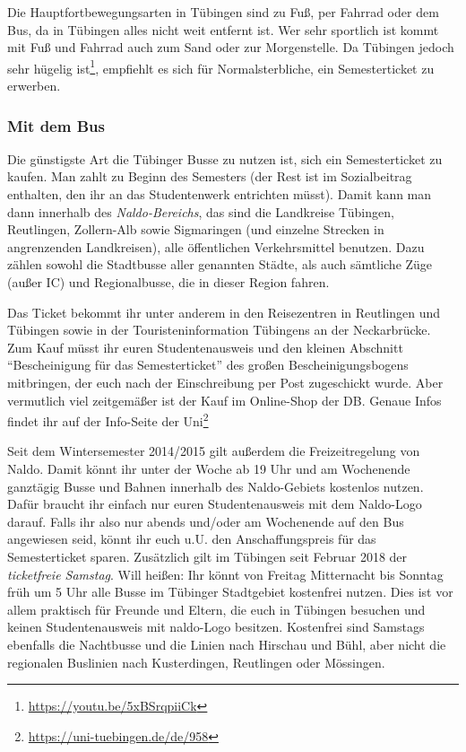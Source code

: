 Die Hauptfortbewegungsarten in Tübingen sind zu Fuß, per Fahrrad oder dem Bus, da in Tübingen alles nicht weit entfernt ist. Wer sehr sportlich ist kommt mit Fuß und Fahrrad auch zum Sand oder zur Morgenstelle. Da Tübingen jedoch sehr hügelig ist\footnote{\url{https://youtu.be/5xBSrqpiiCk}}, empfiehlt es sich für Normalsterbliche, ein Semesterticket zu erwerben.	%
\vfill \pagebreak
\subsubsection*{Mit dem Bus}
Die günstigste Art die Tübinger Busse zu nutzen ist, sich ein Semesterticket zu kaufen. Man zahlt zu Beginn des Semesters \Ticketpreis (der Rest ist im Sozialbeitrag enthalten, den ihr an das Studentenwerk entrichten müsst).  Damit kann man dann innerhalb des \emph{Naldo-Bereichs}, das sind die Landkreise Tübingen, Reutlingen, Zollern-Alb sowie Sigmaringen (und einzelne Strecken in angrenzenden Landkreisen), alle öffentlichen Verkehrsmittel benutzen. Dazu zählen sowohl die Stadtbusse aller genannten Städte, als auch sämtliche Züge (außer IC) und Regionalbusse, die in dieser Region fahren.

Das Ticket bekommt ihr unter anderem in den Reisezentren in Reutlingen und Tübingen sowie in der Touristeninformation Tübingens an der Neckarbrücke. Zum Kauf müsst ihr euren Studentenausweis und den kleinen Abschnitt "`Bescheinigung für das Semesterticket"' des großen Bescheinigungsbogens mitbringen, der euch nach der Einschreibung per Post zugeschickt wurde. Aber vermutlich viel zeitgemäßer ist der Kauf im Online-Shop der DB. Genaue Infos findet ihr auf der Info-Seite der Uni\footnote{\url{https://uni-tuebingen.de/de/958}}

Seit dem Wintersemester 2014/2015 gilt außerdem die Freizeitregelung von Naldo. Damit könnt ihr unter der Woche ab 19 Uhr und am Wochenende ganztägig Busse und Bahnen innerhalb des Naldo-Gebiets kostenlos nutzen. Dafür braucht ihr einfach nur euren Studentenausweis mit dem Naldo-Logo darauf. Falls ihr also nur abends und/oder am Wochenende auf den Bus angewiesen seid, könnt ihr euch u.U. den Anschaffungspreis für das Semesterticket sparen.
Zusätzlich gilt im Tübingen seit Februar 2018 der \emph{ticketfreie Samstag}. Will heißen: Ihr könnt von Freitag Mitternacht bis Sonntag früh um 5 Uhr alle Busse im Tübinger Stadtgebiet kostenfrei nutzen. Dies ist vor allem praktisch für Freunde und Eltern, die euch in Tübingen besuchen und keinen Studentenausweis mit naldo-Logo besitzen. Kostenfrei sind Samstags ebenfalls die Nachtbusse und die Linien nach Hirschau und Bühl, aber nicht die regionalen Buslinien nach Kusterdingen, Reutlingen oder Mössingen. 

